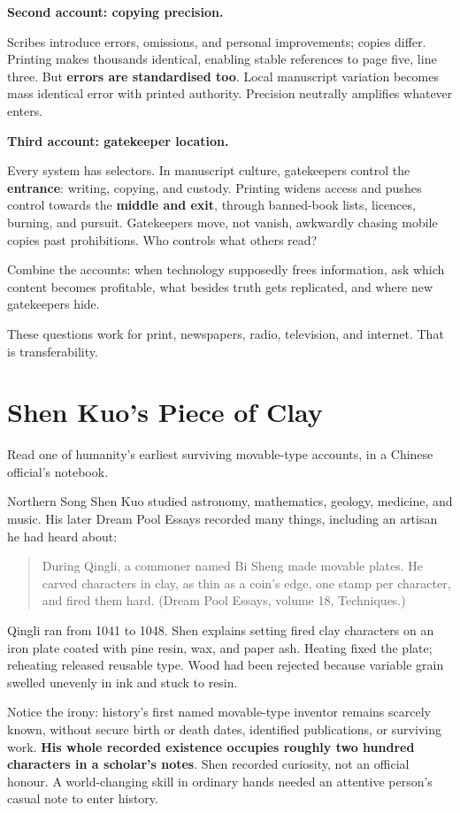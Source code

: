 \textbf{Second account: copying precision.}

Scribes introduce errors, omissions, and personal improvements; copies differ. Printing makes thousands identical, enabling stable references to page five, line three. But \textbf{errors are standardised too}. Local manuscript variation becomes mass identical error with printed authority. Precision neutrally amplifies whatever enters.

\textbf{Third account: gatekeeper location.}

Every system has selectors. In manuscript culture, gatekeepers control the \textbf{entrance}: writing, copying, and custody. Printing widens access and pushes control towards the \textbf{middle and exit}, through banned-book lists, licences, burning, and pursuit. Gatekeepers move, not vanish, awkwardly chasing mobile copies past prohibitions. Who controls what others read?

Combine the accounts: when technology supposedly frees information, ask which content becomes profitable, what besides truth gets replicated, and where new gatekeepers hide.

These questions work for print, newspapers, radio, television, and internet. That is transferability.

\section{Shen Kuo's Piece of Clay}
Read one of humanity's earliest surviving movable-type accounts, in a Chinese official's notebook.

Northern Song Shen Kuo studied astronomy, mathematics, geology, medicine, and music. His later Dream Pool Essays recorded many things, including an artisan he had heard about:

\begin{quote}
During Qingli, a commoner named Bi Sheng made movable plates. He carved characters in clay, as thin as a coin's edge, one stamp per character, and fired them hard. (Dream Pool Essays, volume 18, Techniques.)
\end{quote}
Qingli ran from 1041 to 1048. Shen explains setting fired clay characters on an iron plate coated with pine resin, wax, and paper ash. Heating fixed the plate; reheating released reusable type. Wood had been rejected because variable grain swelled unevenly in ink and stuck to resin.

Notice the irony: history's first named movable-type inventor remains scarcely known, without secure birth or death dates, identified publications, or surviving work. \textbf{His whole recorded existence occupies roughly two hundred characters in a scholar's notes}. Shen recorded curiosity, not an official honour. A world-changing skill in ordinary hands needed an attentive person's casual note to enter history.

